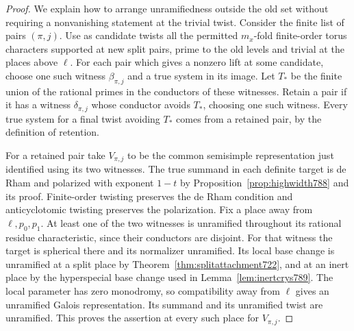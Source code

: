 \documentclass[a4paper,11pt]{article}
\theoremstyle{definition}
\theoremstyle{remark}
\numberwithin{equation}{section}
\begin{document}
\begin{proof}
We explain how to arrange unramifiedness outside the old set
without requiring a nonvanishing statement at the trivial twist.
Consider the finite list of pairs \((\pi,j)\). Use as candidate
twists all the permitted \(m_x\)-fold finite-order torus characters
supported at new split pairs, prime to the old levels and trivial
at the places above \(\ell\). For each pair which gives a nonzero
lift at some candidate, choose one such witness \(\beta_{\pi,j}\)
and a true system in its image. Let \(T_*\) be the finite union
of the rational primes in the conductors of these witnesses.
Retain a pair if it has a witness \(\delta_{\pi,j}\) whose
conductor avoids \(T_*\), choosing one such witness. Every true
system for a final twist avoiding \(T_*\) comes from a retained
pair, by the definition of retention.

For a retained pair take \(V_{\pi,j}\) to be the common
semisimple representation just identified using its two witnesses.
The true summand in each definite target is de Rham and polarized
with exponent \(1-t\) by Proposition~\ref{prop:highwidth788}
and its proof. Finite-order twisting preserves the de Rham
condition and anticyclotomic twisting preserves the polarization.
Fix a place away from \(\ell,p_0,p_1\). At least one of the two
witnesses is unramified throughout its rational residue
characteristic, since their conductors are disjoint. For that
witness the target is spherical there and its normalizer
unramified. Its local base change is unramified at a split place
by Theorem~\ref{thm:splitattachment722}, and at an inert place by
the hyperspecial base change used in Lemma~\ref{lem:inertcrys789}.
The local parameter has zero monodromy, so compatibility away
from \(\ell\) gives an unramified Galois representation. Its
summand and its unramified twist are unramified. This proves the
assertion at every such place for \(V_{\pi,j}\).
\end{proof}
\end{document}
